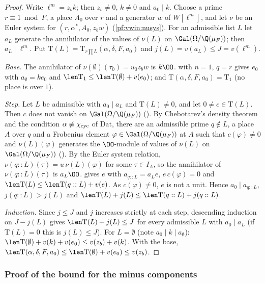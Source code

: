 \begin{proof}
Write $\ell^m=z_bk$; then $z_b\ne0$, $k\ne0$ and $a_0\mid k$. Choose a prime $r\equiv1\bmod F$, a place $A_0$ over $r$ and a generator $w$ of
$W[\ell^m]$, and let $\nu$ be an Euler system for $(r,\alpha^*,A_0,z_bw)$ (\cref{pf:vwin:nusys}). For an admissible list $L$ let $a_L$ generate
the annihilator of the values of $\nu(L)$ on $\Gal(\Omega/\Q(\mu_F))$; then $a_L\mid\ell^m$. Put $\mathrm{T}(L)=\mathrm{T}_{r\prod L}(\alpha,\delta,F,a_0)$
and $j(L)=v(a_L)\le J=v(\ell^m)$.

\emph{Base.} The annihilator of $\nu(\emptyset)(\tau_0)=u_0z_bw$ is $k\OO$.  with $n=1$, $q=r$ gives $e_0$ with $a_\emptyset=ke_0$ and
$\len\mathrm{T}_1\le\len\mathrm{T}(\emptyset)+v(e_0)$; and $\mathrm{T}(\alpha,\delta,F,a_0)=\mathrm{T}_1$ (no place is over $1$).

\emph{Step.} Let $L$ be admissible with $a_0\mid a_L$ and $\mathrm{T}(L)\ne0$, and let $0\ne c\in\mathrm{T}(L)$. Then $c$ does not vanish on
$\Gal(\Omega/\Q(\mu_F))$ (). By Chebotarev's density theorem and the condition $\alpha\not\equiv\chi_{\mathrm{cyc}}$ of
$\mathrm{Dat}$, there are an admissible prime $q\notin L$, a place $A$ over $q$ and a Frobenius element $\varphi\in\Gal(\Omega/\Q(\mu_F))$ at $A$ such
that $c(\varphi)\ne0$ and $\nu(L)(\varphi)$ generates the $\OO$-module of values of $\nu(L)$ on $\Gal(\Omega/\Q(\mu_F))$
(). By the Euler system relation, $\nu(q::L)(\tau)=u\,\nu(L)(\varphi)$ for some $\tau\in I_A$, so the annihilator
of $\nu(q::L)(\tau)$ is $a_L\OO$.  gives $e$ with $a_{q::L}=a_Le$, $e\,c(\varphi)=0$ and
$\len\mathrm{T}(L)\le\len\mathrm{T}(q::L)+v(e)$. As $c(\varphi)\ne0$, $e$ is not a unit. Hence $a_0\mid a_{q::L}$, $j(q::L)>j(L)$ and
$\len\mathrm{T}(L)+j(L)\le\len\mathrm{T}(q::L)+j(q::L)$.

\emph{Induction.} Since $j\le J$ and $j$ increases strictly at each step, descending induction on $J-j(L)$ gives
$\len\mathrm{T}(L)+j(L)\le J$ for every admissible $L$ with $a_0\mid a_L$ (if $\mathrm{T}(L)=0$ this is $j(L)\le J$). For $L=\emptyset$ (note
$a_0\mid k\mid a_\emptyset$): $\len\mathrm{T}(\emptyset)+v(k)+v(e_0)\le v(z_b)+v(k)$. With the base,
$\len\mathrm{T}(\alpha,\delta,F,a_0)\le\len\mathrm{T}(\emptyset)+v(e_0)\le v(z_b)$.
\end{proof}

\subsubsection{Proof of the bound for the minus components}

